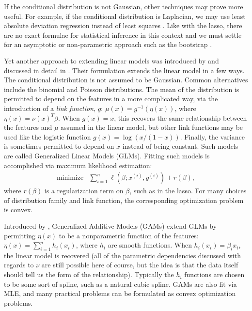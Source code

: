 \documentclass[12pt]{article}
\begin{document}
If the conditional distribution is not Gaussian, other techniques may prove more useful. For example, if the conditional distribution is Laplacian, we may use least absolute deviation regression instead of least squares \cite{Birkes:1993}. Like with the lasso, there are no exact formulae for statistical inference in this context and we must settle for an asymptotic or non-parametric approach such as the bootstrap \cite{Efron:1993}.

Yet another approach to extending linear models was introduced by \cite{NW:72} and discussed in detail in \cite{MN:1983}. Their formulation extends the linear model in a few ways. The conditional distribution is not assumed to be Gaussian. Common alternatives include the binomial and Poisson distributions. The mean of the distribution is permitted to depend on the features in a more complicated way, via the introduction of a \textit{link function}, $g$: $\mu(x) = g^{-1}(\eta(x))$, where $\eta(x) = \nu(x)^T \beta$. When $g(x) = x$, this recovers the same relationship between the features and $\mu$ assumed in the linear model, but other link functions may be used like the logistic function $g(x) = \log(x / (1-x))$. Finally, the variance is sometimes permitted to depend on $x$ instead of being constant. Such models are called Generalized Linear Models (GLMs). Fitting such models is accomplished via maximum likelihood estimation:
\begin{displaymath}
        \begin{array}{ll}
            \mbox{minimize} & {\displaystyle \sum_{i=1}^n} \ell\left( \beta; x^{(i)}, y^{(i)}\right) + r(\beta),
        \end{array}
\end{displaymath}
where $r(\beta)$ is a regularization term on $\beta$, such as in the lasso. For many choices of distribution family and link function, the corresponding optimization problem is convex.

Introduced by \cite{HT:86}, Generalized Additive Models (GAMs) extend GLMs by permitting $\eta(x)$ to be a nonparametric function of the features: $\eta(x) = \sum_{i=1}^p h_i (x_i)$, where $h_i$ are smooth functions. When $h_i(x_i) = \beta_i x_i$, the linear model is recovered (all of the parametric dependencies discussed with regards to $\nu$  are still possible here of course, but the idea is that the data itself should tell us the form of the relationship). Typically the $h_i$ functions are chosen to be some sort of spline, such as a natural cubic spline. GAMs are also fit via MLE, and many practical problems can be formulated as convex optimization problems.
\end{document}
